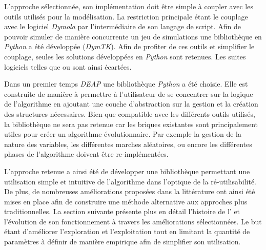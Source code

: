 L’approche sélectionnée, son implémentation doit être simple à coupler avec les outils
utilisés pour la modélisation. La restriction principale étant le couplage avec le
logiciel \textit{Dymola} par l’intermédiaire de son langage de script. Afin
de pouvoir simuler de manière concurrente un jeu de simulations une bibliothèque
en \textit{Python} a été développée (\textit{DymTK}). Afin de profiter de ces outils et
simplifier le couplage, seules les solutions développées en \textit{Python} sont retenues.
Les suites logiciels telles que 
ou  sont ainsi écartées.

Dans un premier temps \textit{DEAP} \parencite{Fortin20122171} une bibliothèque
\textit{Python} a été choisie. Elle est construite de manière à permettre à
l’utilisateur de se concentrer sur la logique de l’algorithme en ajoutant une
couche d’abstraction sur la gestion et la création des structures nécessaires.
Bien que compatible avec les différents outils utilisés, la bibliothèque ne sera
pas retenue car les briques existantes sont principalement utiles pour créer un
algorithme évolutionnaire. Par exemple la gestion de la nature des variables,
les différentes marches aléatoires, ou encore les différentes phases de
l’algorithme  doivent être re-implémentées.

L’approche retenue a ainsi été de développer une bibliothèque permettant une utilisation
simple et intuitive de l’algorithme dans l’optique de la ré-utilisabilité. De plus,
de nombreuses améliorations proposées dans la littérature ont ainsi été mises en place
afin de construire une méthode alternative aux approches plus traditionnelles.
La section suivante présente plus en détail l’histoire de l’ et l’évolution de
son fonctionnement à travers les améliorations sélectionnées.
Le but étant d’améliorer l’exploration et l’exploitation tout en limitant la quantité
de paramètres à définir de manière empirique afin de simplifier son utilisation.



